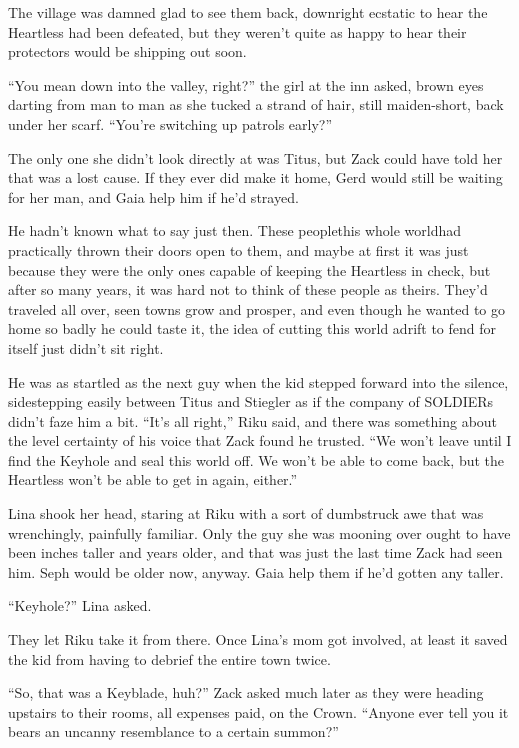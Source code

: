 
The village was damned glad to see them back, downright ecstatic to hear the Heartless had been defeated, but they weren't quite as happy to hear their protectors would be shipping out soon.

``You mean down into the valley, right?'' the girl at the inn asked, brown eyes darting from man to man as she tucked a strand of hair, still maiden-short, back under her scarf. ``You're switching up patrols early?''

The only one she didn't look directly at was Titus, but Zack could have told her that was a lost cause. If they ever did make it home, Gerd would still be waiting for her man, and Gaia help him if he'd strayed.

He hadn't known what to say just then. These people\textemdash this whole world\textemdash had practically thrown their doors open to them, and maybe at first it was just because they were the only ones capable of keeping the Heartless in check, but after so many years, it was hard not to think of these people as theirs. They'd traveled all over, seen towns grow and prosper, and even though he wanted to go home so badly he could taste it, the idea of cutting this world adrift to fend for itself just didn't sit right.

He was as startled as the next guy when the kid stepped forward into the silence, sidestepping easily between Titus and Stiegler as if the company of SOLDIERs didn't faze him a bit. ``It's all right,'' Riku said, and there was something about the level certainty of his voice that Zack found he trusted. ``We won't leave until I find the Keyhole and seal this world off. We won't be able to come back, but the Heartless won't be able to get in again, either.''

Lina shook her head, staring at Riku with a sort of dumbstruck awe that was wrenchingly, painfully familiar. Only the guy she was mooning over ought to have been inches taller and years older, and that was just the last time Zack had seen him. Seph would be older now, anyway. Gaia help them if he'd gotten any taller.

``Keyhole?'' Lina asked.

They let Riku take it from there. Once Lina's mom got involved, at least it saved the kid from having to debrief the entire town twice.

``So, that was a Keyblade, huh?'' Zack asked much later as they were heading upstairs to their rooms, all expenses paid, on the Crown. ``Anyone ever tell you it bears an uncanny resemblance to a certain summon?''

